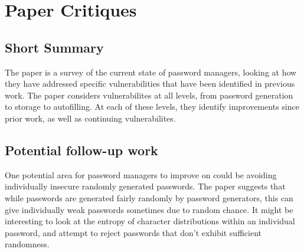 \documentclass[11pt]{article}
\begin{document}
\section*{Paper Critiques}

\subsection*{Short Summary}

The paper is a survey of the current state of password managers, looking at how they have addressed specific vulnerabilities that have been identified in previous work.
The paper considers vulnerabilites at all levels, from password generation to storage to autofilling.
At each of these levels, they identify improvements since prior work, as well as continuing vulnerabilites.

\subsection*{Potential follow-up work}

One potential area for password managers to improve on could be avoiding individually insecure randomly generated passwords.
The paper suggests that while passwords are generated fairly randomly by password generators, this can give individually weak passwords sometimes due to random chance.
It might be interesting to look at the entropy of character distributions within an individual password, and attempt to reject passwords that don't exhibit sufficient randomness.
\end{document}
